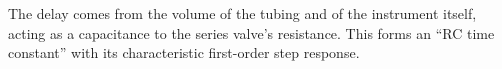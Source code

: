 The delay comes from the volume of the tubing and of the instrument itself, acting as a capacitance to the series valve's resistance.  This forms an ``RC time constant'' with its characteristic first-order step response.




